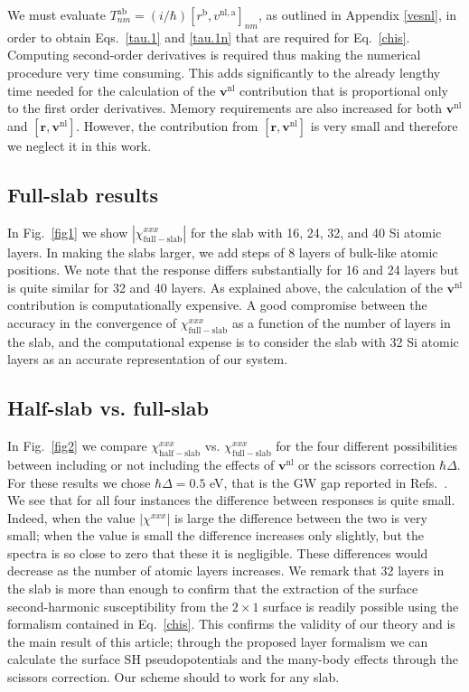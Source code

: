 \documentclass[floatfix,prb,aps,superscriptaddress,showpacs,11pt,preprint,letterpaper]{revtex4}
\begin{document}
We must evaluate 
$T^{\mathrm{a}\mathrm{b}}_{nm}=(i/\hbar)[r^\mathrm{b},v^{\mathrm{nl},\mathrm{a}}]_{nm}$,
as outlined in Appendix \ref{vesnl},
in order to obtain 
Eqs.~\eqref{tau.1} and \eqref{tau.1n} that are required for 
Eq.~\eqref{chis}.
Computing second-order 
derivatives is required thus making the numerical procedure very 
time consuming. This adds significantly to the already lengthy time needed 
for the calculation of the $\mathbf{v}^\mathrm{nl}$ contribution that is
proportional only to 
the first order derivatives. 
Memory requirements are also increased for both $\mathbf{v}^\mathrm{nl}$ and 
$[\mathbf{r},\mathbf{v}^\mathrm{nl}]$. However, the contribution from $[\mathbf{r},\mathbf{v}^\mathrm{nl}]$ 
is very small\cite{valerie} and therefore we neglect it in this work.

\subsection{Full-slab results}\label{fsresults}

In Fig.~\ref{fig1} we show $|\chi_{\mathrm{full-slab}}^{xxx}|$
for the slab with
16, 24, 32, and 40 Si atomic layers. 
In making the slabs larger, we add steps of 8 layers of bulk-like atomic positions. 
We note that the response differs substantially 
for 16 and 24 layers but is quite similar for 32 and 40 layers.
As explained above,
the calculation of the $\mathbf{v}^\mathrm{nl}$ contribution is 
computationally expensive.
A good compromise between the accuracy in the convergence of
$\chi^{xxx}_{\mathrm{full-slab}}$ as a function of the number
of layers in the slab, and the computational 
expense is to consider
the slab with 32 Si atomic layers as 
an accurate representation of our 
system.

\subsection{Half-slab vs. full-slab}

In Fig.~\ref{fig2}
we compare 
$\chi^{xxx}_{\mathrm{half-slab}}$  
vs. 
$\chi^{xxx}_{\mathrm{full-slab}}$ 
for the four different possibilities 
between including or not including the
effects of $\mathbf{v}^\mathrm{nl}$ or the scissors correction
$\hbar\Delta$.   
For these results we chose
$\hbar\Delta=0.5$ eV, that is the GW gap reported in
Refs.~. 
We see that for all four instances the 
difference between responses is quite small.
Indeed, when the value $|\chi^{xxx}|$ 
is large the difference between the two is very small; 
when the value is small the difference increases only slightly, 
but the spectra is so close to zero that these it is negligible. 
These differences would decrease as the number of atomic layers 
increases. We remark that 32 layers in the slab is more than enough 
to confirm that the extraction of the surface second-harmonic 
susceptibility from the $2\times 1$ surface is readily possible 
using the formalism contained in Eq.~\eqref{chis}.
This confirms the validity of our theory and is the main result of
this article; through the proposed layer formalism we can calculate the surface SH
pseudopotentials
and the many-body effects through the scissors correction.
Our scheme should to work for any slab.  
\end{document}

